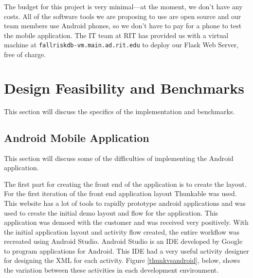 \documentclass[conference]{IEEEtran}
\begin{document}
The budget for this project is very minimal---at the moment, we don't have any costs. All of the software tools we are proposing to use are open source and our team members use Android phones, so we don't have to pay for a phone to test the mobile application. The IT team at RIT has provided us with a virtual machine at \texttt{fallriskdb-vm.main.ad.rit.edu} to deploy our Flask Web Server, free of charge.

\section{Design Feasibility and Benchmarks}

This section will discuss the specifics of the implementation and benchmarks.

\subsection{Android Mobile Application}
This section will discuss some of the difficulties of implementing the Android application. 

The first part for creating the front end of the application is to create the layout. For the first iteration of the front end application layout Thunkable was used. This website has a lot of tools to rapidly prototype android applications and was used to create the initial demo layout and flow for the application. This application was demoed with the customer and was received very positively. With the initial application layout and activity flow created, the entire workflow was recreated using Android Studio. Android Studio is an IDE developed by Google to program applications for Android. This IDE had a very useful activity designer for designing the XML for each activity. Figure \ref{thunkvsandroid}, below, shows the variation between these activities in each development environment.
\end{document}
